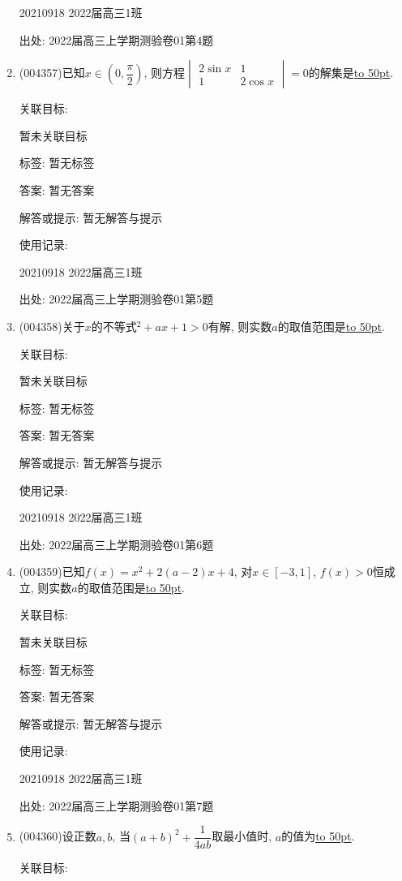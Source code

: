 \documentclass[10pt,a4paper]{article}
\newcommand{\blank}[1]{\underline{\hbox to #1pt{}}}
\begin{document}
\begin{enumerate}[1.]
20210918	2022届高三1班	


出处: 2022届高三上学期测验卷01第4题
\item { (004357)}已知$x\in (0,\dfrac{\pi}2)$, 则方程$\begin{vmatrix} 2\sin x   & 1  \\1  & 2\cos x  \end{vmatrix}=0$的解集是\blank{50}.


关联目标:

暂未关联目标



标签: 暂无标签

答案: 暂无答案

解答或提示: 暂无解答与提示

使用记录:

20210918	2022届高三1班	


出处: 2022届高三上学期测验卷01第5题
\item { (004358)}关于$x$的不等式$^2+ax+1>0$有解, 则实数$a$的取值范围是\blank{50}.


关联目标:

暂未关联目标



标签: 暂无标签

答案: 暂无答案

解答或提示: 暂无解答与提示

使用记录:

20210918	2022届高三1班	


出处: 2022届高三上学期测验卷01第6题
\item { (004359)}已知$f(x)=x^2+2(a-2)x+4$, 对$x\in[-3, 1]$, $f(x)>0$恒成立, 则实数$a$的取值范围是\blank{50}.


关联目标:

暂未关联目标



标签: 暂无标签

答案: 暂无答案

解答或提示: 暂无解答与提示

使用记录:

20210918	2022届高三1班	


出处: 2022届高三上学期测验卷01第7题
\item { (004360)}设正数$a,b$, 当$(a+b)^2+\dfrac{1}{4ab}$取最小值时, $a$的值为\blank{50}.


关联目标:


\end{enumerate}
\end{document}
